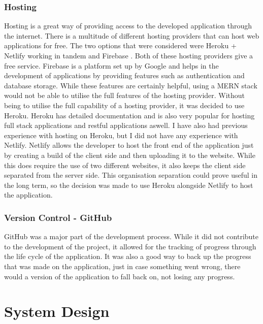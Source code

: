 \subsection{Hosting}
Hosting is a great way of providing access to the developed application through the internet. There is a multitude of different hosting providers that can host web applications for free. The two options that were considered were Heroku + Netlify working in tandem and Firebase \cite{heroku}\cite{firebase}. Both of these hosting providers give a free service. Firebase is a platform set up by Google and helps in the development of applications by providing features such as authentication and database storage. While these features are certainly helpful, using a MERN stack would not be able to utilise the full features of the hosting provider. Without being to utilise the full capability of a hosting provider, it was decided to use Heroku. Heroku has detailed documentation and is also very popular for hosting full stack applications and restful applications aswell. I have also had previous experience with hosting on Heroku, but I did not have any experience with Netlify. Netlify allows the developer to host the front end of the application just by creating a build of the client side and then uploading it to the website. While this does require the use of two different websites, it also keeps the client side separated from the server side. This organisation separation could prove useful in the long term, so the decision was made to use Heroku alongside Netlify to host the application.

\subsection{Version Control - GitHub}
GitHub was a major part of the development process. While it did not contribute to the development of the project, it allowed for the tracking of progress through the life cycle of the application. It was also a good way to back up the progress that was made on the application, just in case something went wrong, there would a version of the application to fall back on, not losing any progress.

\chapter{System Design}
